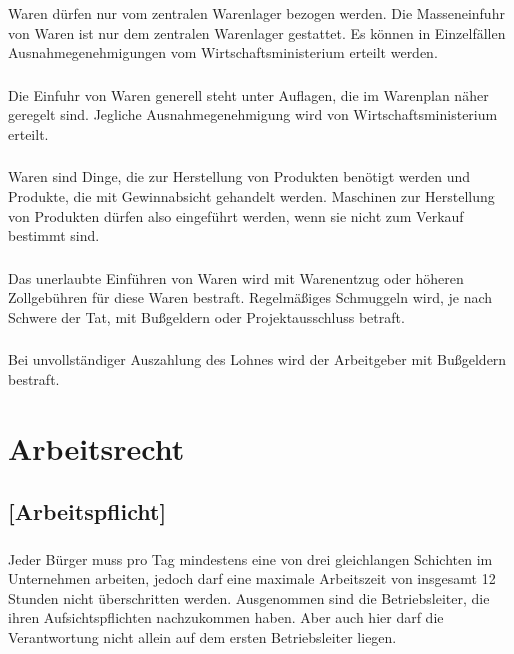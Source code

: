 \documentclass[a4paper, 11pt]{report}
\let\oldsubsection\subsection
\renewcommand{\subsection}{\leftskip=40pt\oldsubsection}
\begin{document}
 
\subsubsection{}
Waren dürfen nur vom zentralen Warenlager bezogen werden. Die Masseneinfuhr von Waren ist nur dem zentralen Warenlager gestattet. Es können in Einzelfällen Ausnahmegenehmigungen vom Wirtschaftsministerium erteilt werden. 

\subsubsection{}
Die Einfuhr von Waren generell steht unter Auflagen, die im Warenplan näher geregelt sind. Jegliche Ausnahmegenehmigung wird von Wirtschaftsministerium erteilt. 

\subsubsection{}
Waren sind Dinge, die zur Herstellung von Produkten benötigt werden und Produkte, die mit Gewinnabsicht gehandelt werden. Maschinen zur Herstellung von Produkten dürfen also eingeführt werden, wenn sie nicht zum Verkauf bestimmt sind. 

\subsubsection{}
Das unerlaubte Einführen von Waren wird mit Warenentzug oder höheren Zollgebühren für diese Waren bestraft. Regelmäßiges Schmuggeln wird, je nach Schwere der Tat, mit Bußgeldern oder Projektausschluss betraft. 

\subsubsection{}
Bei unvollständiger Auszahlung des Lohnes wird der Arbeitgeber mit Bußgeldern bestraft. 


\section{Arbeitsrecht}

\subsection{[Arbeitspflicht]}

 
\subsubsection{}
Jeder Bürger muss pro Tag mindestens eine von drei gleichlangen Schichten im Unternehmen arbeiten, jedoch darf eine maximale Arbeitszeit von insgesamt 12 Stunden nicht überschritten werden. Ausgenommen sind die Betriebsleiter, die ihren Aufsichtspflichten nachzukommen haben. Aber auch hier darf die Verantwortung nicht allein auf dem ersten Betriebsleiter liegen. 
\end{document}
